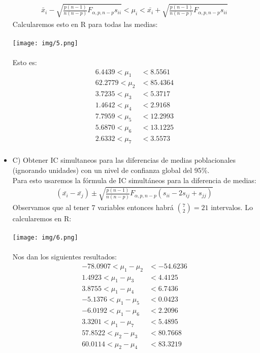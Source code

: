 \begin{sol}
\begin{itemize}
\begin{align*}
\bar{x}_i-\sqrt{\frac{p(n-1)}{n(n-p)}F_{\alpha,p,n-p}s_{ii}}<\mu_i<\bar{x_i}+\sqrt{\frac{p(n-1)}{n(n-p)}F_{\alpha,p,n-p}s_{ii}}
\end{align*}
Calcularemos esto en R para todas las medias:\\\\
\texttt{[image: img/5.png]}\\\\
Esto es:
\begin{align*}
6.4439 < \mu_1 &< 8.5561 \\
62.2779 < \mu_2 &< 85.4364 \\
3.7235 < \mu_3 &< 5.3717 \\
1.4642 < \mu_4 &< 2.9168 \\
7.7959 < \mu_5 &< 12.2993 \\
5.6870 < \mu_6 &< 13.1225 \\
2.6332 < \mu_7 &< 3.5573 \\
\end{align*}
\pagebreak
\item C) Obtener IC simultaneos para las diferencias de medias poblacionales (ignorando  
unidades) con un nivel de confianza global del 95\%. \\
Para esto usaremos la fórmula de IC simultáneos para la diferencia de medias:
\begin{align*}
(\bar{x_i}-\bar{x_j}) \pm \sqrt{\frac{p(n-1)}{n(n-p)}F_{\alpha,p,n-p}(s_{ii}-2s_{ij}+s_{jj})}
\end{align*}
Observamos que al tener 7 variables entonces habrá $\binom{7}{2} = 21$ intervalos. Lo calcularemos en R:\\\\
\texttt{[image: img/6.png]}\\\\
Nos dan los siguientes resultados:
\begin{align*}
-78.0907 < \mu_{1} - \mu_{2} &< -54.6236 \\
1.4923 < \mu_{1} - \mu_{3} &< 4.4125 \\
3.8755 < \mu_{1} - \mu_{4} &< 6.7436 \\
-5.1376 < \mu_{1} - \mu_{5} &< 0.0423 \\
-6.0192 < \mu_{1} - \mu_{6} &< 2.2096 \\
3.3201 < \mu_{1} - \mu_{7} &< 5.4895 \\
57.8522 < \mu_{2} - \mu_{3} &< 80.7668 \\
60.0114 < \mu_{2} - \mu_{4} &< 83.3219 \\

\end{align*}
\end{itemize}
\end{sol}

